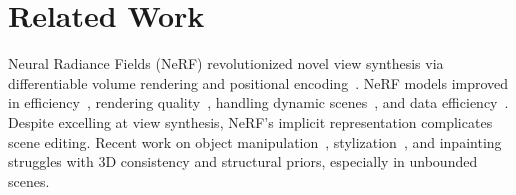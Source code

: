 \section{Related Work}
\label{sec:related}


Neural Radiance Fields (NeRF)\citep{mildenhall2020nerf} revolutionized novel view synthesis via differentiable volume rendering\citep{tulsiani2017mvsupervision, henzler2019platonicgan} and positional encoding~\citep{vaswani2017attentionisallyouneed, gehring2017convolutional}. NeRF models improved in efficiency~\citep{liu2020neural, Garbin_2021_ICCV, chen2024improving}, rendering quality~\citep{mipnerf, zhang2020nerf++,meuleman2023progressively}, handling dynamic scenes~\cite{liu2023robust}, and data efficiency~\citep{pixel.nerf, ibrnet, lin2024frugalnerf,su2024boostmvsnerfs}. Despite excelling at view synthesis, NeRF’s implicit representation complicates scene editing. Recent work on object manipulation~\citep{yang2021learning}, stylization~\citep{wang2023nerf, haque2023instruct}, and inpainting~\citep{nerf.in, spinnerf, mirzaei2023reference} struggles with 3D consistency and structural priors, especially in unbounded scenes.


